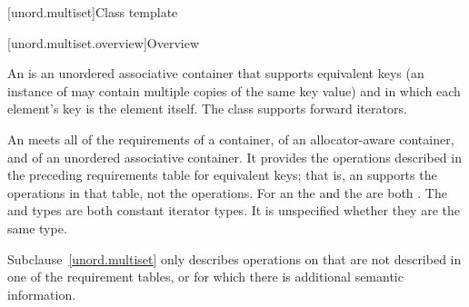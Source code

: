 [unord.multiset]{Class template }%

[unord.multiset.overview]{Overview}

\pnum
{}%
%
An  is an unordered associative container
that supports equivalent keys (an instance of  may contain
multiple copies of the same key value) and in which each element's key
is the element itself.
The  class
supports forward iterators.

\pnum
An  meets all of the requirements
of a container,
of an allocator-aware container, and
of an unordered associative container.
It provides the operations described in the
preceding requirements table for equivalent keys; that is, an 
supports the  operations in that table, not the  operations.
For an  the  and the  are
both . The  and  types are both
constant iterator types. It is unspecified whether they are the same type.

\pnum
Subclause~\ref{unord.multiset} only describes operations on  that
are not described in one of the requirement tables, or for which there
is additional semantic information.

